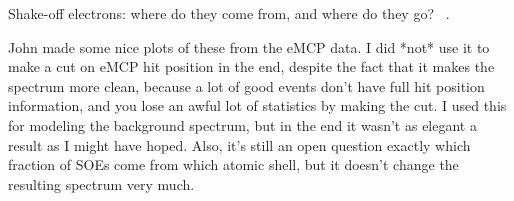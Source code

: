 Shake-off electrons:  where do they come from, and where do they go?  ~\cite{Levinger}.


John made some nice plots of these from the eMCP data.  I did *not* use it to make a cut on eMCP hit position in the end, despite the fact that it makes the spectrum more clean, because a lot of good events don't have full hit position information, and you lose an awful lot of statistics by making the cut.  I used this for modeling the background spectrum, but in the end it wasn't as elegant a result as I might have hoped.  Also, it's still an open question exactly which fraction of SOEs come from which atomic shell, but it doesn't change the resulting spectrum very much.






